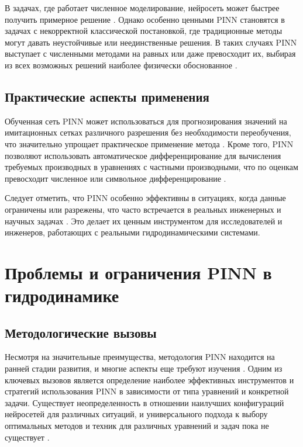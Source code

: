 В задачах, где работает численное моделирование, нейросеть может быстрее получить примерное
решение \cite{kochkov2021machine}. Однако особенно ценными PINN становятся в задачах с некорректной классической постановкой,
где традиционные методы могут давать неустойчивые или неединственные решения. В таких случаях PINN выступает с численными
методами на равных или даже превосходит их, выбирая из всех возможных решений наиболее физически
обоснованное \cite{yang2019adversarial}.

\subsection{Практические аспекты применения}
Обученная сеть PINN может использоваться для прогнозирования значений на имитационных сетках различного разрешения без
необходимости переобучения, что значительно упрощает практическое применение метода \cite{raissi2019physics}. Кроме того,
PINN позволяют использовать автоматическое дифференцирование для вычисления требуемых производных в уравнениях с частными
производными, что по оценкам превосходит численное или символьное дифференцирование \cite{baydin2018automatic}.

Следует отметить, что PINN особенно эффективны в ситуациях, когда данные ограничены или разрежены, что часто встречается
в реальных инженерных и научных задачах \cite{zhu2019physics}. Это делает их ценным инструментом для исследователей и
инженеров, работающих с реальными гидродинамическими системами.

\section{Проблемы и ограничения PINN в гидродинамике}
\subsection{Методологические вызовы}
Несмотря на значительные преимущества, методология PINN находится на ранней стадии развития, и многие аспекты еще требуют
изучения \cite{cuomo2022scientific}. Одним из ключевых вызовов является определение наиболее эффективных инструментов
и стратегий использования PINN в зависимости от типа уравнений и конкретной задачи. Существует неопределенность в отношении
наилучших конфигураций нейросетей для различных ситуаций, и универсального подхода к выбору оптимальных методов и техник
для различных уравнений и задач пока не существует \cite{krishnapriyan2021characterizing}.


